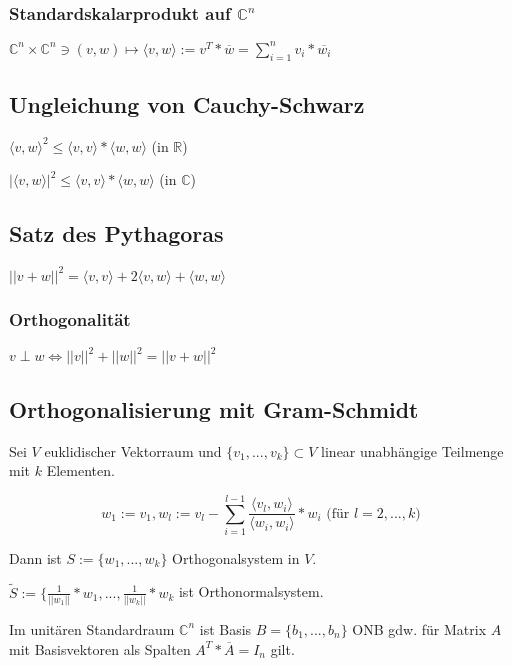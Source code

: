 \subsubsection*{Standardskalarprodukt auf $\mathbb{C}^n$}

$\mathbb{C}^n \times \mathbb{C}^n \ni (v, w) \mapsto \langle v, w \rangle := v^T * \overline w = \sum_{i=1}^n v_i * \overline{w_i}$

\subsection*{Ungleichung von Cauchy-Schwarz}

$\langle v, w \rangle ^2 \leq \langle v, v \rangle * \langle w, w \rangle$ (in $\mathbb{R}$)

$|\langle v, w \rangle |^2 \leq \langle v, v \rangle * \langle w, w \rangle$ (in $\mathbb{C}$)

\subsection*{Satz des Pythagoras}

$||v+w||^2 = \langle v, v \rangle + 2\langle v, w \rangle + \langle w, w \rangle$

\subsubsection*{Orthogonalität}

$v \perp w \Leftrightarrow ||v||^2 + ||w||^2 = ||v+w||^2$

\subsection*{Orthogonalisierung mit Gram-Schmidt}

Sei $V$ euklidischer Vektorraum und $\{v_1, ..., v_k\} \subset V$ linear unabhängige Teilmenge mit $k$ Elementen.

\vspace*{-4mm}
$$w_1 := v_1, w_l := v_l - \sum_{i=1}^{l-1} \frac{\langle v_l, w_i \rangle}{\langle w_i, w_i\rangle}*w_i \text{ (für } l = 2, ..., k)$$

Dann ist $S := \{w_1, ..., w_k\}$ Orthogonalsystem in $V$.

$\tilde S := \{\frac{1}{||w_1||}*w_1, ..., \frac{1}{||w_k||}*w_k$ ist Orthonormalsystem.

Im unitären Standardraum $\mathbb{C}^n$ ist Basis $B = \{b_1, ..., b_n\}$ ONB gdw. für Matrix $A$ mit Basisvektoren als Spalten $A^T*\overline A = I_n$ gilt.

